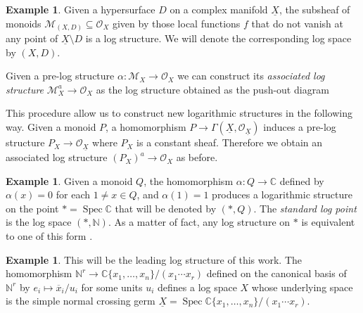 \documentclass[reqno]{amsart}
\newcommand\C{\mathbb{C}}
\newcommand\N{\mathbb{N}}
\newcommand{\OO}{\mathcal{O}}
\DeclareMathOperator{\Spec}{Spec}
\newcommand{\M}{\mathcal{M}}
\theoremstyle{definition}
\newtheorem{example}[theorem]{Example}
\theoremstyle{named}
\begin{document}
\begin{example}\label{ex:log_str_div}
Given a hypersurface $D$ on a complex manifold $\underline{X}$, the subsheaf of monoids $\M_{(X,D)}\subseteq\OO_X$ given by those local functions $f$ that do not vanish at any point of $\underline{X}\setminus D$ is a log structure. We will denote the corresponding log space by $(X,D)$.
\end{example}

Given a pre-log structure $\alpha:\M_X\rightarrow \OO_X$ we can construct its \textit{associated log structure} $\M_X^a\rightarrow \OO_X$ as the log structure obtained as the push-out diagram

\begin{center}
\end{center}

This procedure allow us to construct new  logarithmic structures in the following way. Given a monoid $P$, a homomorphism $P\rightarrow \Gamma(\underline{X}, \OO_{\underline{X}})$ induces a pre-log structure $P_{X}\rightarrow \OO_{\underline{X}}$ where $P_X$ is a constant sheaf. Therefore we obtain an associated log structure $(P_X)^a\rightarrow \OO_X$ as before.

\begin{example}\label{ex: log point}
Given a monoid $Q$, the homomorphism $\alpha: Q\rightarrow \C$ defined by $\alpha(x) = 0$ for each $1\neq x\in Q$, and $\alpha(1) = 1$ produces a logarithmic structure on the point $\ast = \Spec \C$ that will be denoted by $(\ast, Q)$.  The \textit{standard log point} is the log space $(\ast,\N)$. As a matter of fact, any log structure on $\ast$ is equivalent to one of this form \cite{kato1988logarithmic_str}.
\end{example}

\begin{example}\label{ex: ss_log_model}
This will be the leading log structure of this work. The homomorphism $\N^r\rightarrow \C\{x_1,\dots,x_n\}/(x_1\cdots x_r)$ defined on the canonical basis of $\N^r$ by $e_i \mapsto \overline{x}_i/u_i$ for some units $u_i$ defines a log space $X$ whose underlying space is the simple normal crossing germ $\underline{X} = \Spec \C\{x_1,\dots,x_n\}/(x_1\cdots x_r)$.
\end{example}
\end{document}

